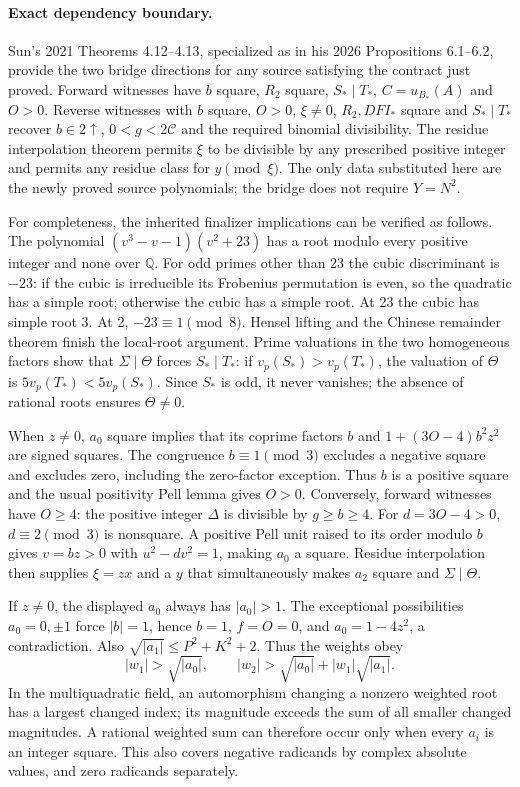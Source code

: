 \paragraph{Exact dependency boundary.}
Sun's 2021 Theorems 4.12--4.13, specialized as in his 2026 Propositions
6.1--6.2, provide the two bridge directions for any source satisfying the
contract just proved. Forward witnesses have $b$ square, $R_2$ square,
$S_*\mid T_*$, $C=u_{B_*}(A)$ and $O>0$. Reverse witnesses with
$b$ square, $O>0$, $\xi\ne0$, $R_2,DFI_*$ square and $S_*\mid T_*$
recover $b\in2\uparrow$, $0<g<2\mathcal C$ and the required binomial
divisibility. The residue interpolation theorem permits $\xi$ to be
divisible by any prescribed positive integer and permits any residue
class for $y\pmod\xi$.
The only data substituted here are the newly proved source polynomials;
the bridge does not require $Y=N^2$.

For completeness, the inherited finalizer implications can be verified
as follows. The polynomial $(v^3-v-1)(v^2+23)$ has a root modulo every
positive integer and none over $\mathbb Q$. For odd primes other than
23 the cubic discriminant is $-23$: if the cubic is irreducible its
Frobenius permutation is even, so the quadratic has a simple root;
otherwise the cubic has a simple root. At 23 the cubic has simple root
3. At 2, $-23\equiv1\pmod8$. Hensel lifting and the Chinese remainder
theorem finish the local-root argument. Prime valuations in the two
homogeneous factors show that $\Sigma\mid\Theta$ forces $S_*\mid T_*$:
if $v_p(S_*)>v_p(T_*)$, the valuation of $\Theta$ is
$5v_p(T_*)<5v_p(S_*)$. Since $S_*$ is odd, it never vanishes; the absence
of rational roots ensures $\Theta\ne0$.

When $z\ne0$, $a_0$ square implies that its coprime factors $b$ and
$1+(3O-4)b^2z^2$ are signed squares. The congruence $b\equiv1\pmod3$
excludes a negative square and excludes zero, including the zero-factor
exception. Thus $b$ is a positive square and the usual positivity Pell
lemma gives $O>0$. Conversely, forward witnesses have $O\ge4$: the
positive integer $\Delta$ is divisible by $g\ge b\ge4$. For
$d=3O-4>0$, $d\equiv2\pmod3$ is nonsquare. A positive Pell unit raised
to its order modulo $b$ gives $v=bz>0$ with $u^2-dv^2=1$, making $a_0$
a square. Residue interpolation then supplies $\xi=zx$ and a $y$ that
simultaneously makes $a_2$ square and $\Sigma\mid\Theta$.

If $z\ne0$, the displayed $a_0$ always has $|a_0|>1$. The exceptional
possibilities $a_0=0,\pm1$ force $|b|=1$, hence $b=1$, $f=O=0$, and
$a_0=1-4z^2$, a contradiction. Also
$\sqrt{|a_1|}\le P^2+K^2+2$. Thus the weights obey
\[
 |w_1|>\sqrt{|a_0|},\qquad
 |w_2|>\sqrt{|a_0|}+|w_1|\sqrt{|a_1|}.
\]
In the multiquadratic field, an automorphism changing a nonzero weighted
root has a largest changed index; its magnitude exceeds the sum of all
smaller changed magnitudes. A rational weighted sum can therefore occur
only when every $a_i$ is an integer square. This also covers negative
radicands by complex absolute values, and zero radicands separately.

